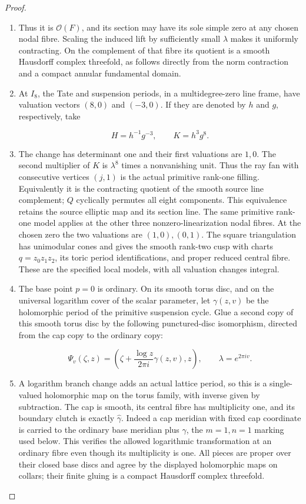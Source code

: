 \begin{proof}
\begin{enumerate}[label=\arabic*.]
\[
 (8G)\cdot O+1-(7G)\cdot O+(-G)\cdot O
 =3+1-3+0=1.
\]

\item Thus it is \(\mathcal O(F)\), and its section may have its
sole simple zero at any chosen nodal fibre.  Scaling the induced
lift by sufficiently small \(\lambda\) makes it uniformly
contracting.  On the complement of that fibre its quotient is a
smooth Hausdorff complex threefold, as follows directly from the
norm contraction and a compact annular fundamental domain.

\item At \(I_8\), the Tate and suspension periods, in a multidegree-zero
line frame, have valuation vectors \((8,0)\) and \((-3,0)\).
If they are denoted by \(h\) and \(g\), respectively, take

\[
 H=h^{-1}g^{-3},\qquad K=h^3g^8.
\]

\item The change has determinant one and their first valuations are
\(1,0\).  The second multiplier of \(K\) is \(\lambda^8\)
times a nonvanishing unit.  Thus the ray fan with consecutive
vertices \((j,1)\) is the actual primitive rank-one filling.
Equivalently it is the contracting quotient of the smooth source
line complement; \(Q\) cyclically permutes all eight components.
This equivalence retains the source elliptic map and its section
line.  The same primitive rank-one model applies at the other
three nonzero-linearization nodal fibres.  At the chosen zero
the two valuations are \((1,0),(0,1)\).  The square triangulation
has unimodular cones and gives the smooth rank-two cusp with
charts \(q=z_0z_1z_2\), its toric period identifications, and
proper reduced central fibre.  These are the specified local
models, with all valuation changes integral.

\item The base point \(p=0\) is ordinary.  On its smooth torus disc,
and on the universal logarithm cover of the scalar parameter,
let \(\gamma(z,v)\) be the holomorphic period of the primitive
suspension cycle. Glue a second copy of this smooth torus disc
by the following punctured-disc isomorphism, directed from the
cap copy to the ordinary copy:

\[
 \Psi_v(\zeta,z)=
 \left(\zeta+\frac{\log z}{2\pi i}\gamma(z,v),z\right),
 \qquad \lambda=e^{2\pi i v}.
\]

\item A logarithm branch change adds an actual lattice period, so this
is a single-valued holomorphic map on the torus family, with
inverse given by subtraction.  The cap is smooth, its central
fibre has multiplicity one, and its boundary clutch is exactly
\(\widehat\gamma\). Indeed a cap meridian with fixed cap coordinate
is carried to the ordinary base meridian plus \(\gamma\), the
\(m=1,n=1\) marking used below. This verifies the allowed logarithmic
transformation at an ordinary fibre even though its multiplicity
is one.  All pieces are proper over their closed base discs and
agree by the displayed holomorphic maps on collars; their finite
gluing is a compact Hausdorff complex threefold.


\end{enumerate}
\end{proof}

